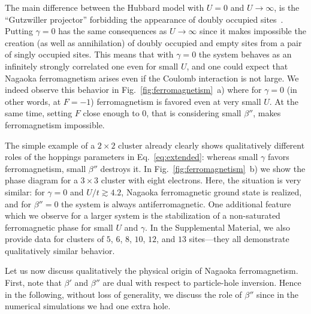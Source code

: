 The main difference between the Hubbard model with $U=0$ and $U\to\infty$, is the ``Gutzwiller projector'' forbidding the appearance of doubly occupied sites~\cite{vollhardt}. Putting $\gamma=0$ has the same consequences as $U\to\infty$ since it makes impossible the creation (as well as annihilation) of doubly occupied and empty sites from a pair of singly occupied sites. This means that with $\gamma=0$ the system behaves as an infinitely strongly correlated one even for small $U$, and one could expect that Nagaoka ferromagnetism arises even if the Coulomb interaction is not large. We indeed observe this behavior in Fig.~\ref{fig:ferromagnetism}~a) where for $\gamma=0$ (in other words, at $F=-1$) ferromagnetism is favored even at very small $U$. At the same time, setting $F$ close enough to $0$, that is considering small $\beta''$, makes ferromagnetism impossible.


The simple example of a $2\times 2$ cluster already clearly shows qualitatively different roles of the hoppings parameters in Eq.~\eqref{eq:extended}: whereas small $\gamma$ favors ferromagnetism, small $\beta''$ destroys it. In Fig.~\ref{fig:ferromagnetism}~b) we show the phase diagram for a $3\times 3$ cluster with eight electrons. Here, the situation is very similar: for $\gamma=0$ and $U/t \gtrsim 4.2$, Nagaoka ferromagnetic ground state is realized, and for $\beta''=0$ the system is always antiferromagnetic. One additional feature which we observe for a larger system is the stabilization of a non-saturated ferromagnetic phase for small $U$ and $\gamma$. In the Supplemental Material, we also provide data for clusters of $5$, $6$, $8$, $10$, $12$, and $13$ sites---they all demonstrate qualitatively similar behavior.


Let us now discuss qualitatively the physical origin of Nagaoka ferromagnetism. First, note that $\beta'$ and $\beta''$ are dual with respect to particle-hole inversion. Hence in the following, without loss of generality, we discuss the role of $\beta''$ since in the numerical simulations we had one extra hole.

